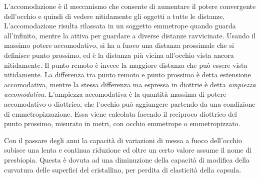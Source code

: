 L’accomodazione è il meccanismo che consente di aumentare il potere convergente dell’occhio e quindi di vedere nitidamente gli oggetti a tutte le distanze.
L’accomodazione risulta rilassata in un soggetto emmetrope quando guarda all’infinito, mentre la attiva per guardare a diverse distanze ravvicinate. Usando il massimo potere accomodativo, si ha a fuoco una distanza prossimale che si definisce punto prossimo, ed è la distanza più vicina all’occhio vista ancora nitidamente. Il punto remoto è invece la maggiore distanza che può essere vista nitidamente. La differenza tra punto remoto e punto prossimo è detta estensione accomodativa, mentre la stessa differenza ma espressa in diottrie è detta \emph{ampiezza accomodativa}. L’ampiezza accomodativa è la quantità massima di potere accomodativo o diottrico, che l’occhio può aggiungere partendo da una condizione di emmetropizzazione. Essa viene calcolata facendo il reciproco diottrico del punto prossimo, misurato in metri, con occhio emmetrope o emmetropizzato.

Con il passare degli anni la capacità di variazioni di messa a fuoco dell’occhio subisce una lenta e continua riduzione ed oltre un certo valore assume il nome di presbiopia. Questa è dovuta ad una diminuzione della capacità di modifica della curvatura delle superfici del cristallino, per perdita di elasticità della capsula.
\\\

